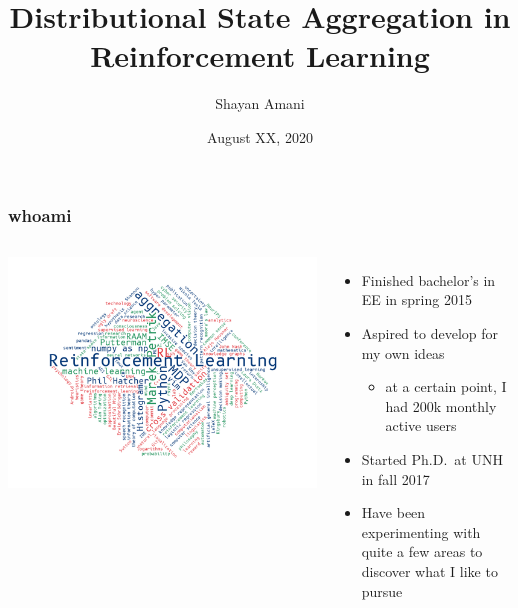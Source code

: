 \documentclass[mathserif]{beamer}
\title{Distributional State Aggregation in Reinforcement Learning}
\author{Shayan Amani}
\date{August XX, 2020}
\institute{Department of Computer Science, University of New Hampshire}
\begin{document}
    \begin{frame}
        \titlepage
    \end{frame}




    \begin{frame}
        \frametitle{whoami}

        \begin{columns}
            \centering
            \includegraphics[width=1\columnwidth]{res/wordcloud.png}

            \begin{itemize}
                \item Finished bachelor's in EE in spring 2015
                \item Aspired to develop for my own ideas
                \begin{itemize}
                    \item at a certain point, I had 200k monthly active users
                \end{itemize}
                \item Started Ph.D.\ at UNH in fall 2017
                \item Have been experimenting with quite a few areas to discover what I like to pursue
            \end{itemize}
        \end{columns}

    \end{frame}
\end{document}
